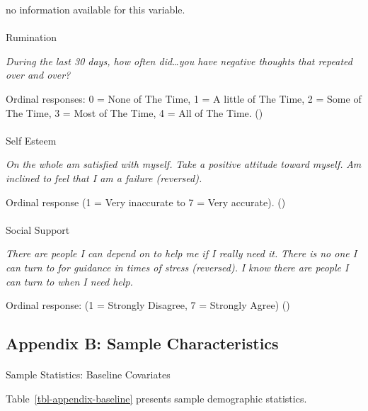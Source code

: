 \documentclass[
  single column]{article}
\makeatletter
\let\oldparagraph\paragraph
\renewcommand{\paragraph}{
    \@ifstar
      \xxxParagraphStar
      \xxxParagraphNoStar
  }
\newcommand{\xxxParagraphStar}[1]{\oldparagraph*{#1}\mbox{}}
\newcommand{\xxxParagraphNoStar}[1]{\oldparagraph{#1}\mbox{}}
\makeatother
\begin{document}
no information available for this variable.

\paragraph{Rumination}\label{rumination}

\emph{During the last 30 days, how often did\ldots you have negative
thoughts that repeated over and over?}

Ordinal responses: 0 = None of The Time, 1 = A little of The Time, 2 =
Some of The Time, 3 = Most of The Time, 4 = All of The Time.
()

\paragraph{Self Esteem}\label{self-esteem}

\emph{On the whole am satisfied with myself.} \emph{Take a positive
attitude toward myself.} \emph{Am inclined to feel that I am a failure
(reversed).}

Ordinal response (1 = Very inaccurate to 7 = Very accurate).
()

\paragraph{Social Support}\label{social-support}

\emph{There are people I can depend on to help me if I really need it.}
\emph{There is no one I can turn to for guidance in times of stress
(reversed).} \emph{I know there are people I can turn to when I need
help.}

Ordinal response: (1 = Strongly Disagree, 7 = Strongly Agree)
()

\newpage{}

\subsection{Appendix B: Sample Characteristics}\label{appendix-sample}

\paragraph{Sample Statistics: Baseline
Covariates}\label{sample-statistics-baseline-covariates}

Table~\ref{tbl-appendix-baseline} presents sample demographic
statistics.
\end{document}
